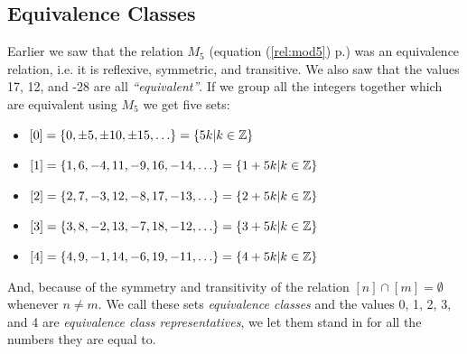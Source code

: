 \clearpage

\subsection*{Equivalence Classes}

\begin{exposition}
    Earlier we saw that the relation \(M_5\) (equation (\ref{rel:mod5}) p.\pageref{rel:mod5}) was an equivalence relation, i.e. it is reflexive, symmetric, and transitive. We also saw that the values 17, 12, and -28 are all \emph{``equivalent''}.  If we group all the integers together which are equivalent using \(M_5\) we get five sets:
    \begin{itemize}
        \item \([0]=\left\{0,\pm5,\pm10,\pm15,\ldots\right\}
            =\left\{5k\middle| k\in\mbox{$\mathbb{Z}$}\right\}\)
        \item \([1]=\left\{1,6,-4,11,-9,16,-14,\ldots\right\}
            =\left\{1+5k\middle| k\in\mbox{$\mathbb{Z}$}\right\}\)
        \item \([2]=\left\{2,7,-3,12,-8,17,-13,\ldots\right\}
            =\left\{2+5k\middle| k\in\mbox{$\mathbb{Z}$}\right\}\)
        \item \([3]=\left\{3,8,-2,13,-7,18,-12,\ldots\right\}
            =\left\{3+5k\middle| k\in\mbox{$\mathbb{Z}$}\right\}\)
        \item \([4]=\left\{4,9,-1,14,-6,19,-11,\ldots\right\}
            =\left\{4+5k\middle| k\in\mbox{$\mathbb{Z}$}\right\}\)
    \end{itemize}
    And, because of the symmetry and transitivity of the relation \([n]\cap[m]=\emptyset\) whenever \(n\neq m\).  We call these sets \emph{equivalence classes} and the values 0, 1, 2, 3, and 4 are \emph{equivalence class representatives}, we let them stand in for all the numbers they are equal to.
\end{exposition}

